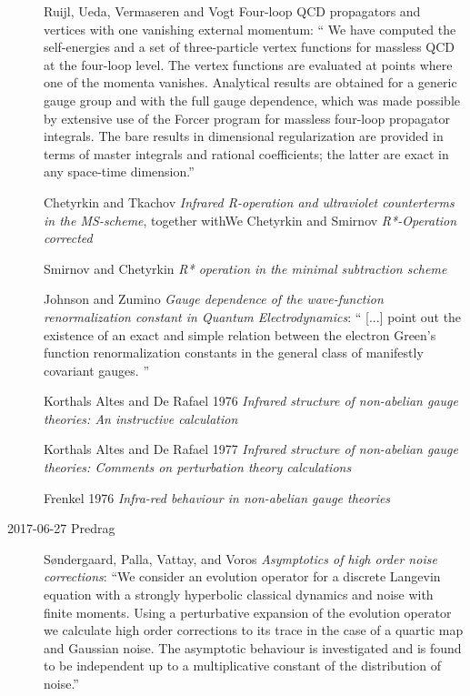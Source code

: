 \begin{description}
Ruijl, Ueda, Vermaseren and Vogt {Four-loop {QCD}
propagators and vertices with one vanishing external momentum}: `` We
have computed the self-energies and a set of three-particle vertex
functions for massless QCD at the four-loop level. The vertex functions
are evaluated at points where one of the momenta vanishes. Analytical
results are obtained for a generic gauge group and with the full gauge
dependence, which was made possible by extensive use of the Forcer
program for massless four-loop propagator integrals. The bare results
in dimensional regularization are provided in terms of master integrals
and rational coefficients; the latter are exact in any space-time
dimension.''

Chetyrkin and Tkachov {\em Infrared {R}-operation and
ultraviolet counterterms in the {MS}-scheme}, together withWe
Chetyrkin and Smirnov
{\em {R*}-Operation corrected}

Smirnov and Chetyrkin
{\em {R*} operation in the minimal subtraction scheme}

Johnson and Zumino {\em Gauge dependence of the
wave-function renormalization constant in {Quantum Electrodynamics}}: ``
[...] point out the existence of an exact and simple relation between the
electron Green's function renormalization constants in the general class
of manifestly covariant gauges.
''

Korthals Altes and De Rafael 1976
{\em Infrared structure of non-abelian gauge theories:
     {An} instructive calculation}

Korthals Altes and De Rafael 1977
{\em Infrared structure of non-abelian gauge theories:
    {Comments} on perturbation theory calculations}

Frenkel \etal{} 1976
{\em Infra-red behaviour in non-abelian gauge theories}


\item[2017-06-27 Predrag]
S{\o}ndergaard, Palla,  Vattay, and Voros
{\em Asymptotics of high order noise corrections}:
``We consider an evolution operator for a discrete Langevin equation with a
strongly hyperbolic classical dynamics and noise with finite moments.
Using a perturbative expansion of the evolution operator we calculate
high order corrections to its trace in the case of a quartic map and
Gaussian noise. The asymptotic behaviour is investigated and is found to
be independent up to a multiplicative constant of the distribution of
noise.''



\end{description}
